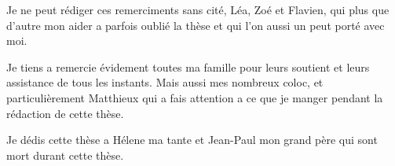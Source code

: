 \documentclass[main.tex]{subfiles}
\begin{document}
Je ne peut rédiger ces remerciments sans cité, Léa, Zoé et Flavien, qui plus que d'autre mon aider a parfois oublié la thèse et qui l'on aussi un peut porté avec moi.

Je tiens a remercie évidement toutes ma famille pour leurs soutient et leurs assistance de tous les instants. Mais aussi mes nombreux coloc, et particulièrement Matthieux qui a fais attention a ce que je manger pendant la rédaction de cette thèse.


Je dédis cette thèse a Hélene ma tante et Jean-Paul mon grand père qui sont mort durant cette thèse.
\end{document}
